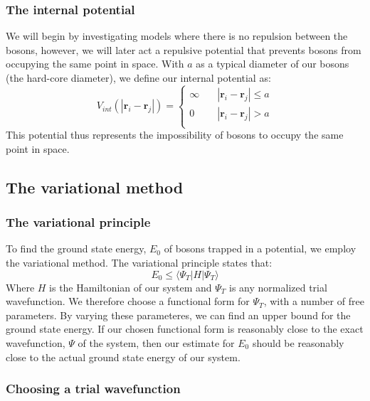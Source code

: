 \documentclass[a4paper, 10pt]{article}
\begin{document}
\subsubsection{The internal potential}
We will begin by investigating models where there is no repulsion between the bosons, however, we will later act a repulsive potential that prevents bosons from occupying the same point in space. With $a$ as a typical diameter of our bosons (the hard-core diameter), we define our internal potential as:
\begin{equation}
V_{int}(|\boldsymbol{r}_i-\boldsymbol{r}_j|)= 
     \begin{cases}
       \infty & \quad |\boldsymbol{r}_i-\boldsymbol{r}_j| \leq  a\\
       0 & \quad |\boldsymbol{r}_i-\boldsymbol{r}_j|>  a\\
     \end{cases}
\end{equation}
This potential thus represents the impossibility of bosons to occupy the same point in space.
\subsection{The variational method}
\subsubsection{The variational principle}
To find the ground state energy, $E_0$ of bosons trapped in a potential, we employ the variational method. The variational principle states that:
\begin{equation}
E_0\leq \langle \Psi_T |H|\Psi_T \rangle
\end{equation}
Where $H$ is the Hamiltonian of our system and $\Psi_T$ is any normalized trial wavefunction. We therefore choose a functional form for $\Psi_T$, with a number of free parameters. By varying these parameteres, we can find an upper bound for the ground state energy. If our chosen functional form is reasonably close to the exact wavefunction, $\Psi$ of the system, then our estimate for $E_0$ should be reasonably close to the actual ground state energy of our system.
\subsubsection{Choosing a trial wavefunction}
\end{document}
